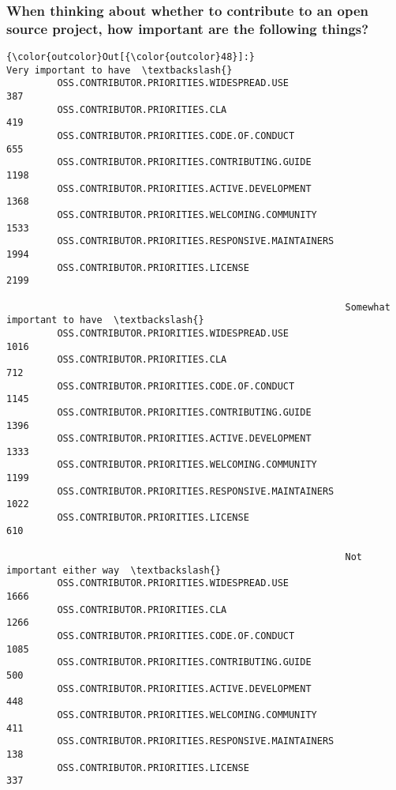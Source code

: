 \documentclass[11pt]{article}
\begin{document}
    \subsubsection{When thinking about whether to contribute to an open
source project, how important are the following
things?}\label{when-thinking-about-whether-to-contribute-to-an-open-source-project-how-important-are-the-following-things}


            \begin{Verbatim}[commandchars=\\\{\}]
{\color{outcolor}Out[{\color{outcolor}48}]:}                                                    Very important to have  \textbackslash{}
         OSS.CONTRIBUTOR.PRIORITIES.WIDESPREAD.USE                             387   
         OSS.CONTRIBUTOR.PRIORITIES.CLA                                        419   
         OSS.CONTRIBUTOR.PRIORITIES.CODE.OF.CONDUCT                            655   
         OSS.CONTRIBUTOR.PRIORITIES.CONTRIBUTING.GUIDE                        1198   
         OSS.CONTRIBUTOR.PRIORITIES.ACTIVE.DEVELOPMENT                        1368   
         OSS.CONTRIBUTOR.PRIORITIES.WELCOMING.COMMUNITY                       1533   
         OSS.CONTRIBUTOR.PRIORITIES.RESPONSIVE.MAINTAINERS                    1994   
         OSS.CONTRIBUTOR.PRIORITIES.LICENSE                                   2199   
         
                                                            Somewhat important to have  \textbackslash{}
         OSS.CONTRIBUTOR.PRIORITIES.WIDESPREAD.USE                                1016   
         OSS.CONTRIBUTOR.PRIORITIES.CLA                                            712   
         OSS.CONTRIBUTOR.PRIORITIES.CODE.OF.CONDUCT                               1145   
         OSS.CONTRIBUTOR.PRIORITIES.CONTRIBUTING.GUIDE                            1396   
         OSS.CONTRIBUTOR.PRIORITIES.ACTIVE.DEVELOPMENT                            1333   
         OSS.CONTRIBUTOR.PRIORITIES.WELCOMING.COMMUNITY                           1199   
         OSS.CONTRIBUTOR.PRIORITIES.RESPONSIVE.MAINTAINERS                        1022   
         OSS.CONTRIBUTOR.PRIORITIES.LICENSE                                        610   
         
                                                            Not important either way  \textbackslash{}
         OSS.CONTRIBUTOR.PRIORITIES.WIDESPREAD.USE                              1666   
         OSS.CONTRIBUTOR.PRIORITIES.CLA                                         1266   
         OSS.CONTRIBUTOR.PRIORITIES.CODE.OF.CONDUCT                             1085   
         OSS.CONTRIBUTOR.PRIORITIES.CONTRIBUTING.GUIDE                           500   
         OSS.CONTRIBUTOR.PRIORITIES.ACTIVE.DEVELOPMENT                           448   
         OSS.CONTRIBUTOR.PRIORITIES.WELCOMING.COMMUNITY                          411   
         OSS.CONTRIBUTOR.PRIORITIES.RESPONSIVE.MAINTAINERS                       138   
         OSS.CONTRIBUTOR.PRIORITIES.LICENSE                                      337   
         

\end{Verbatim}
\end{document}
